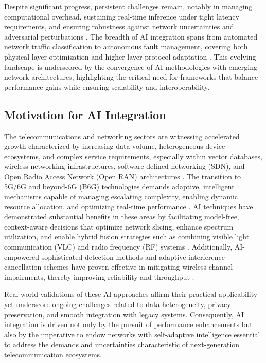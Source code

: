 Despite significant progress, persistent challenges remain, notably in managing computational overhead, sustaining real-time inference under tight latency requirements, and ensuring robustness against network uncertainties and adversarial perturbations \cite{ref7,ref8,ref9}. The breadth of AI integration spans from automated network traffic classification to autonomous fault management, covering both physical-layer optimization and higher-layer protocol adaptation \cite{ref10,ref49,ref50}. This evolving landscape is underscored by the convergence of AI methodologies with emerging network architectures, highlighting the critical need for frameworks that balance performance gains while ensuring scalability and interoperability.

\subsection{Motivation for AI Integration}

The telecommunications and networking sectors are witnessing accelerated growth characterized by increasing data volume, heterogeneous device ecosystems, and complex service requirements, especially within vector databases, wireless networking infrastructures, software-defined networking (SDN), and Open Radio Access Network (Open RAN) architectures \cite{ref21,ref22,ref23}. The transition to 5G/6G and beyond-6G (B6G) technologies demands adaptive, intelligent mechanisms capable of managing escalating complexity, enabling dynamic resource allocation, and optimizing real-time performance \cite{ref24,ref25}. AI techniques have demonstrated substantial benefits in these areas by facilitating model-free, context-aware decisions that optimize network slicing, enhance spectrum utilization, and enable hybrid fusion strategies such as combining visible light communication (VLC) and radio frequency (RF) systems \cite{ref51,ref52}. Additionally, AI-empowered sophisticated detection methods and adaptive interference cancellation schemes have proven effective in mitigating wireless channel impairments, thereby improving reliability and throughput \cite{ref54,ref55}. 

Real-world validations of these AI approaches affirm their practical applicability yet underscore ongoing challenges related to data heterogeneity, privacy preservation, and smooth integration with legacy systems. Consequently, AI integration is driven not only by the pursuit of performance enhancements but also by the imperative to endow networks with self-adaptive intelligence essential to address the demands and uncertainties characteristic of next-generation telecommunication ecosystems.


